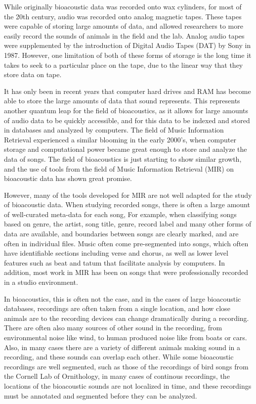 While originally bioacoustic data was recorded onto wax cylinders, for
most of the 20th century, audio was recorded onto analog magnetic
tapes.  These tapes were capable of storing large amounts of data, and
allowed researchers to more easily record the sounds of animals in the
field and the lab.  Analog audio tapes were supplemented by the
introduction of Digital Audio Tapes (DAT) by Sony in 1987.  However,
one limitation of both of these forms of storage is the long time it
takes to seek to a particular place on the tape, due to the linear way
that they store data on tape.

It has only been in recent years that computer hard drives and RAM has
become able to store the large amounts of data that sound represents.
This represents another quantum leap for the field of bioacoustics, as
it allows for large amounts of audio data to be quickly accessible,
and for this data to be indexed and stored in databases and analyzed
by computers.  The field of Music Information Retrieval experienced a
similar blooming in the early 2000's, when computer storage and
computational power became great enough to store and analyze the data
of songs.  The field of bioacoustics is just starting to show similar
growth, and the use of tools from the field of Music Information
Retrieval (MIR) on bioacoustic data has shown great promise.

However, many of the tools developed for MIR are not well adapted for
the study of bioacoustic data.  When studying recorded songs, there is
often a large amount of well-curated meta-data for each song, For
example, when classifying songs based on genre, the artist, song
title, genre, record label and many other forms of data are available,
and boundaries between songs are clearly marked, and are often in
individual files.  Music often come pre-segmented into songs, which
often have identifiable sections including verse and chorus, as well
as lower level features such as beat and tatum that facilitate
analysis by computers.  In addition, most work in MIR has been on
songs that were professionally recorded in a studio environment.

In bioacoustics, this is often not the case, and in the cases of large
bioacoustic databases, recordings are often taken from a single
location, and how close animals are to the recording devices can
change dramatically during a recording.  There are often also many
sources of other sound in the recording, from environmental noise like
wind, to human produced noise like from boats or cars. Also, in many
cases there are a variety of different animals making sound in a
recording, and these sounds can overlap each other.  While some
bioacoustic recordings are well segmented, such as those of the
recordings of bird songs from the Cornell Lab of Ornithology, in many
cases of continous recordings, the locations of the bioacoustic sounds
are not localized in time, and these recordings must be annotated and
segmented before they can be analyzed.

